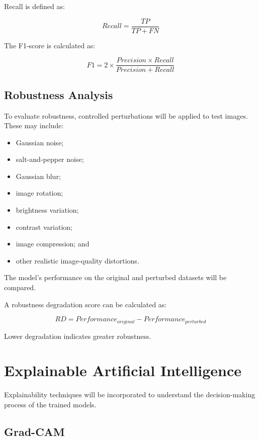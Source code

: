 \documentclass[12pt,a4paper]{article}
\begin{document}
Recall is defined as:

\begin{equation}
Recall = \frac{TP}{TP + FN}
\end{equation}

The F1-score is calculated as:

\begin{equation}
F1 = 2 \times \frac{Precision \times Recall}{Precision + Recall}
\end{equation}

\subsection{Robustness Analysis}

To evaluate robustness, controlled perturbations will be applied to test images. These may include:

\begin{itemize}
    \item Gaussian noise;
    \item salt-and-pepper noise;
    \item Gaussian blur;
    \item image rotation;
    \item brightness variation;
    \item contrast variation;
    \item image compression; and
    \item other realistic image-quality distortions.
\end{itemize}

The model's performance on the original and perturbed datasets will be compared.

A robustness degradation score can be calculated as:

\begin{equation}
RD = Performance_{original} - Performance_{perturbed}
\end{equation}

Lower degradation indicates greater robustness.

\section{Explainable Artificial Intelligence}

Explainability techniques will be incorporated to understand the decision-making process of the trained models.

\subsection{Grad-CAM}
\end{document}
